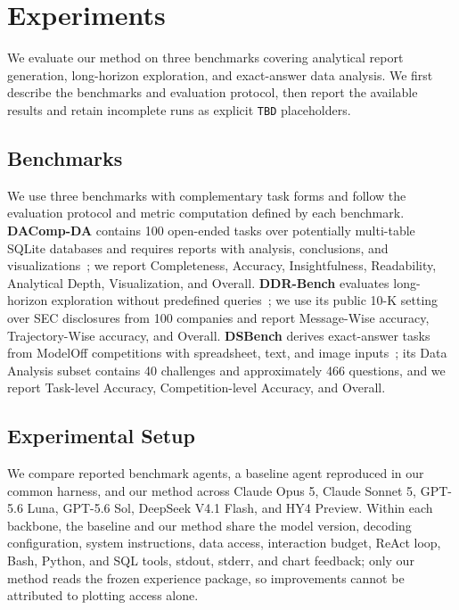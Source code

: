 \documentclass{article}
\begin{document}
\section{Experiments}
\label{sec:experiments}

We evaluate our method on three benchmarks covering analytical report generation, long-horizon exploration, and exact-answer data analysis.
We first describe the benchmarks and evaluation protocol, then report the available results and retain incomplete runs as explicit \texttt{TBD} placeholders.

\subsection{Benchmarks}
\label{sec:benchmarks}

We use three benchmarks with complementary task forms and follow the evaluation protocol and metric computation defined by each benchmark.
\textbf{DAComp-DA} contains 100 open-ended tasks over potentially multi-table SQLite databases and requires reports with analysis, conclusions, and visualizations~\citep{lei2025dacomp}; we report Completeness, Accuracy, Insightfulness, Readability, Analytical Depth, Visualization, and Overall.
\textbf{DDR-Bench} evaluates long-horizon exploration without predefined queries~\citep{liu2026ddrbench}; we use its public 10-K setting over SEC disclosures from 100 companies and report Message-Wise accuracy, Trajectory-Wise accuracy, and Overall.
\textbf{DSBench} derives exact-answer tasks from ModelOff competitions with spreadsheet, text, and image inputs~\citep{jing2024dsbench}; its Data Analysis subset contains 40 challenges and approximately 466 questions, and we report Task-level Accuracy, Competition-level Accuracy, and Overall.

\subsection{Experimental Setup}
\label{sec:main-exp-setup}

We compare reported benchmark agents, a baseline agent reproduced in our common harness, and our method across Claude Opus 5, Claude Sonnet 5, GPT-5.6 Luna, GPT-5.6 Sol, DeepSeek V4.1 Flash, and HY4 Preview.
Within each backbone, the baseline and our method share the model version, decoding configuration, system instructions, data access, interaction budget, ReAct loop, Bash, Python, and SQL tools, stdout, stderr, and chart feedback; only our method reads the frozen experience package, so improvements cannot be attributed to plotting access alone.
\end{document}
